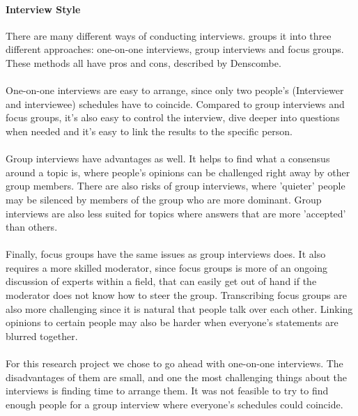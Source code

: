 \documentclass{article}
\begin{document}
\paragraph{Interview Style}
There are many different ways of conducting interviews. \cite{denscombe} groups it into
three different approaches: one-on-one interviews, group interviews and focus groups.
These methods all have pros and cons, described by Denscombe.
\\ \\
One-on-one interviews are easy to arrange, since
only two people's (Interviewer and interviewee) schedules have to coincide.
Compared to group interviews and focus groups, it's also easy to control the interview,
dive deeper into questions when needed and it's easy to link the results
to the specific person.
\\ \\
Group interviews have advantages as well. It helps to find what a consensus around
a topic is, where people's opinions can be challenged right away by other group members.
There are also risks of group interviews, where 'quieter' people may be silenced by
members of the group who are more dominant. Group interviews are also less suited
for topics where answers that are more 'accepted' than others.
\\ \\
Finally, focus groups have the same issues as group interviews does. It also
requires a more skilled moderator, since focus groups is more of an ongoing
discussion of experts within a field, that can easily get out of hand if the
moderator does not know how to steer the group.  Transcribing focus groups are also
more challenging since it is natural that people talk over each other. Linking opinions
to certain people may also be harder when everyone's statements are blurred together.
\\ \\
For this research project we chose to go ahead with one-on-one interviews.
The disadvantages of them are small, and one the most challenging things
about the interviews is finding time to arrange them. It was not feasible
to try to find enough people for a group interview where everyone's schedules
could coincide.
\end{document}
